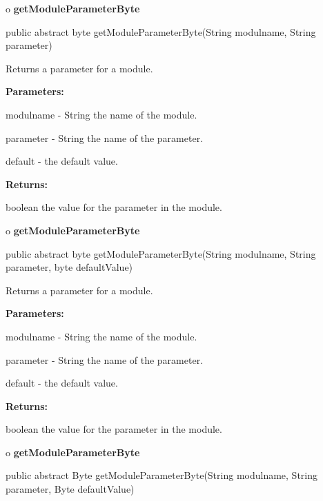 o {\bf getModuleParameterByte} 

\begin{PRE}
 public abstract byte getModuleParameterByte(String modulname,
                                             String parameter)
\end{PRE}

\begin{description}
\htmlDD Returns a parameter for a module. 

\begin{description}
\item {\bf Parameters:}  

modulname - String the name of the module.  

parameter - String the name of the parameter.  

default - the default value.  
\item {\bf Returns:}  

boolean the value for the parameter in the module.  
\end{description}

\end{description}

o {\bf getModuleParameterByte} 

\begin{PRE}
 public abstract byte getModuleParameterByte(String modulname,
                                             String parameter,
                                             byte defaultValue)
\end{PRE}

\begin{description}
\htmlDD Returns a parameter for a module. 

\begin{description}
\item {\bf Parameters:}  

modulname - String the name of the module.  

parameter - String the name of the parameter.  

default - the default value.  
\item {\bf Returns:}  

boolean the value for the parameter in the module.  
\end{description}

\end{description}

o {\bf getModuleParameterByte} 

\begin{PRE}
 public abstract Byte getModuleParameterByte(String modulname,
                                             String parameter,
                                             Byte defaultValue)
\end{PRE}


